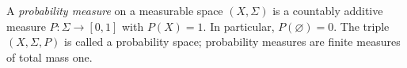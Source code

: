 
A \emph{probability measure} on a measurable space $(X,\Sigma)$ is a countably additive measure $P:\Sigma\to[0,1]$ with $P(X)=1$. In particular, $P(\varnothing)=0$. The triple $(X,\Sigma,P)$ is called a probability space; probability measures are finite measures of total mass one.
